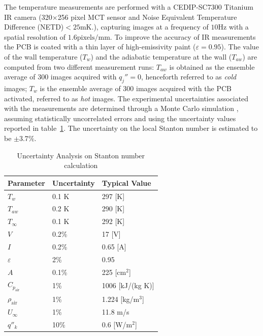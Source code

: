 The temperature measurements are performed with a CEDIP-SC7300 Titanium IR camera (320$\times$256 pixel MCT sensor and Noise Equivalent Temperature Difference (NETD)$<25\mathrm{mK}$.), capturing images at a frequency of $10\mathrm{Hz}$ with a spatial resolution of $1.6\mathrm{pixels/mm}$. To improve the accuracy of IR measurements the PCB is coated with a thin layer of high-emissivity paint ($\varepsilon = 0.95$). The value of the wall temperature ($T_w$) and the adiabatic temperature at the wall ($T_{aw}$) are computed from two different measurement runs: $T_{aw}$ is obtained as the ensemble average of 300 images acquired with $q_j''= 0$, henceforth referred to as \textit{cold} images; $T_w$ is the ensemble average of 300 images acquired with the PCB activated, referred to as \textit{hot} images. The experimental uncertainties associated with the measurements are determined through a Monte Carlo simulation \citep{minkina2009infrared}, assuming statistically uncorrelated errors and using the uncertainty values reported in table~\ref{tab:uncertainties}. The uncertainty on the local Stanton number is estimated to be $\pm 3.7\%$.

\begin{table}
\centering
\begin{tabular}{lll}
\toprule
Parameter & Uncertainty & Typical Value \\ \midrule
$T_w$ & 0.1 K & 297 [K]  \\
$T_{aw}$ & 0.2 K & 290 [K] \\
$T_\infty$ & 0.1 K & 292 [K] \\
$V$ & 0.2\% & 17 [V] \\
$I$ & 0.2\% & 0.65 [A] \\
$\varepsilon$ & 2\% & 0.95 \\
$A$ & 0.1\% & 225 [cm$^2$] \\
$C_{p_{\mathrm{air}}}$ & 1\% & 1006 [kJ/(kg K)] \\
$\rho_{\mathrm{air}}$ & 1\% & 1.224 [kg/m$^3$] \\
$U_\infty$ & 1\% & 11.8 m/s \\
$q''_k$ & 10\% & 0.6 [W/m$^2$] \\ 
\bottomrule
\end{tabular}
\caption{Uncertainty Analysis on Stanton number calculation} \label{tab:uncertainties}
\end{table}

